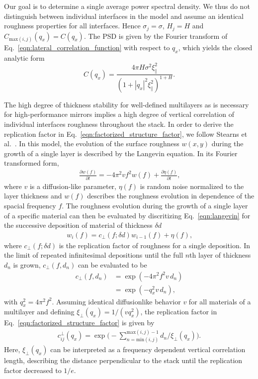 Our goal is to determine a single average power spectral density. We thus do not distinguish between individual interfaces in the model and assume an identical roughness properties for all interfaces. Hence $\sigma_j = \sigma$, $H_j = H$ and $C_{\text{max}(i,j)}(q_x) = C(q_x)$. The PSD is given by the Fourier transform of Eq.~\eqref{eqn:lateral_correlation_function} with respect to $q_x$, which yields the closed analytic form
\begin{equation}
        C(q_x) = \frac{4 \pi H \sigma^2 \xi_\parallel^2}{(1+|q_x|^2\xi_\parallel^2)^{1+H}} \text{.} \label{eqn:psd} 
\end{equation}


The high degree of thickness stability for well-defined multilayers as is necessary for high-performance mirrors implies a high degree of vertical correlation of individual interfaces roughness throughout the stack. In order to derive the replication factor in Eq.~\eqref{eqn:factorized_structure_factor}, we follow Stearns et al.~\cite{stearns:4286}. In this model, the evolution of the surface roughness $w(x,y)$ during the growth of a single layer is described by the Langevin equation. In its Fourier transformed form, 
\begin{align}
\frac{\partial w(f)}{\partial t} = - 4 \pi^2 v f^2 w(f) + \frac{\partial \eta(f)}{\partial t} \text{,} \label{eqn:langevin}
\end{align}
where $v$ is a diffusion-like parameter, $\eta(f)$ is random noise normalized to the layer thickness and $w(f)$ describes the roughness evolution in dependence of the spacial frequency $f$. The roughness evolution during the growth of a single layer of a specific material can then be evaluated by discritizing Eq.~\eqref{eqn:langevin} for the successive deposition of material of thickness $\delta d$
\begin{align}
w_i(f) = c_\perp(f;\delta d) w_{i-1}(f) + \eta(f) \text{,}
\end{align}
where $c_\perp(f;\delta d)$ is the replication factor of roughness for a single deposition. In the limit of repeated infinitesimal depositions until the full $n$th layer of thickness $d_n$ is grown, $c_\perp(f,d_n)$ can be evaluated to be \cite{spiller1993multilayer}
\begin{align}
    c_\perp(f,d_n) &= \exp(-4\pi^2 f^2 v \,d_n) \nonumber \\
                   &= \exp(-q_x^2 v \,d_n)\text{,}
\end{align}
with $q_x^2 = 4 \pi^2 f^2$. Assuming identical diffusionlike behavior $v$ for all materials of a multilayer and defining $\xi_\perp(q_x) = 1/(v q_x^2)$, the replication factor in Eq.~\eqref{eqn:factorized_structure_factor} is given by
\begin{align}
c_{ij}^\perp(q_x) =  \exp\Bigg(-\sum \limits_{n = \text{min}(i,j)}^{\text{max}(i,j)-1}d_n/\xi_\perp(q_x) \Bigg)\text{.}
\end{align}
Here, $\xi_\perp(q_x)$ can be interpreted as a frequency dependent vertical correlation length, describing the distance perpendicular to the stack until the replication factor decreased to $1/e$.

